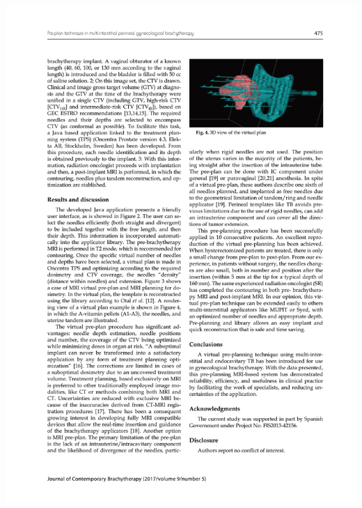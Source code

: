 \documentclass[
  a4paper,
]{scrreprt}
\begin{document}
\includegraphics{articulos/preplan/preplan-4.png}
\end{document}
